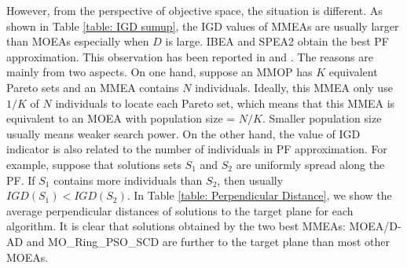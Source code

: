 \documentclass[conference]{IEEEtran}
\begin{document}
 However, from the perspective of objective space, the situation is different. As shown in Table \ref{table: IGD sumup}, the IGD values of MMEAs are usually larger than MOEAs especially when $D$ is large. IBEA and SPEA2 obtain the best PF approximation. This observation has been reported in \cite{MO-Ring-PSO-SCD} and \cite{Shir:2009dz}. The reasons are mainly from two aspects. On one hand, suppose an MMOP has $K$ equivalent Pareto sets and an MMEA contains $N$ individuals. Ideally, this MMEA only use $1/K$ of $N$ individuals to locate each Pareto set,  which means that this MMEA is equivalent to an MOEA with population size = $N/K$. Smaller population size usually means weaker search power. On the other hand, the value of IGD indicator is also related to the number of individuals in PF approximation. For example, suppose that solutions sets $S_1$ and $S_2$ are uniformly spread along the PF. If $S_1$ contains more individuals than $S_2$, then usually $IGD(S_1) < IGD(S_2)$. In Table \ref{table: Perpendicular Distance}, we show the average perpendicular distances of solutions to the target plane for each algorithm. It is clear that solutions obtained by the two best MMEAs: MOEA/D-AD and MO\_Ring\_PSO\_SCD are further to the target plane than most other MOEAs.
\end{document}
